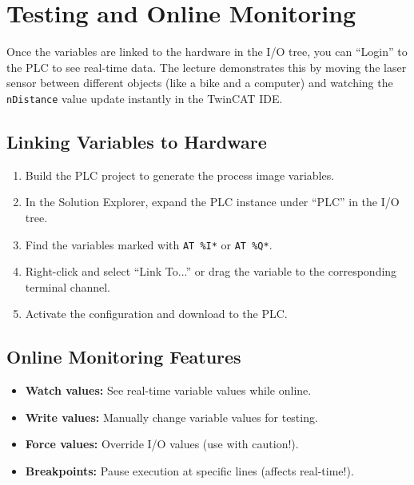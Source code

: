 \documentclass[11pt,a4paper]{article}
\begin{document}
\section{Testing and Online Monitoring}

Once the variables are linked to the hardware in the I/O tree, you can ``Login'' to the PLC to see real-time data. The lecture demonstrates this by moving the laser sensor between different objects (like a bike and a computer) and watching the \texttt{nDistance} value update instantly in the TwinCAT IDE.

\subsection{Linking Variables to Hardware}

\begin{enumerate}
    \item Build the PLC project to generate the process image variables.
    \item In the Solution Explorer, expand the PLC instance under ``PLC'' in the I/O tree.
    \item Find the variables marked with \texttt{AT \%I*} or \texttt{AT \%Q*}.
    \item Right-click and select ``Link To...'' or drag the variable to the corresponding terminal channel.
    \item Activate the configuration and download to the PLC.
\end{enumerate}

\subsection{Online Monitoring Features}

\begin{itemize}[leftmargin=*]
    \item \textbf{Watch values:} See real-time variable values while online.
    \item \textbf{Write values:} Manually change variable values for testing.
    \item \textbf{Force values:} Override I/O values (use with caution!).
    \item \textbf{Breakpoints:} Pause execution at specific lines (affects real-time!).
\end{itemize}
\end{document}
